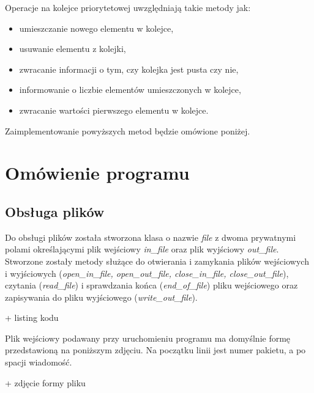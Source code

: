 \documentclass[12pt]{article}
\begin{document}
Operacje na kolejce priorytetowej uwzględniają takie metody jak: 
\begin{itemize}
    \item umieszczanie nowego elementu w kolejce,
    \item usuwanie elementu z kolejki,
    \item zwracanie informacji o tym, czy kolejka jest pusta czy nie,
    \item informowanie o liczbie elementów umieszczonych w kolejce,
    \item zwracanie wartości pierwszego elementu w kolejce.
\end{itemize}
Zaimplementowanie powyższych metod będzie omówione poniżej.


\section{Omówienie programu}
\subsection{Obsługa plików}
Do obsługi plików została stworzona klasa o nazwie \textit{file} z dwoma prywatnymi polami 
określającymi plik wejściowy \textit{in\_file} oraz plik wyjściowy \textit{out\_file}.
Stworzone zostały metody służące do otwierania i zamykania plików wejściowych i wyjściowych 
(\textit{open\_in\_file, open\_out\_file, close\_in\_file, close\_out\_file}), 
czytania (\textit{read\_file}) i sprawdzania końca (\textit{end\_of\_file}) pliku wejściowego
oraz zapisywania do pliku wyjściowego (\textit{write\_out\_file}).

\colorbox{Dandelion}{+ listing kodu} 

Plik wejściowy podawany przy uruchomieniu programu ma domyślnie formę przedstawioną 
na poniższym zdjęciu. Na początku linii jest numer pakietu, a po spacji wiadomość. 

\colorbox{Dandelion}{+ zdjęcie formy pliku}
\end{document}
